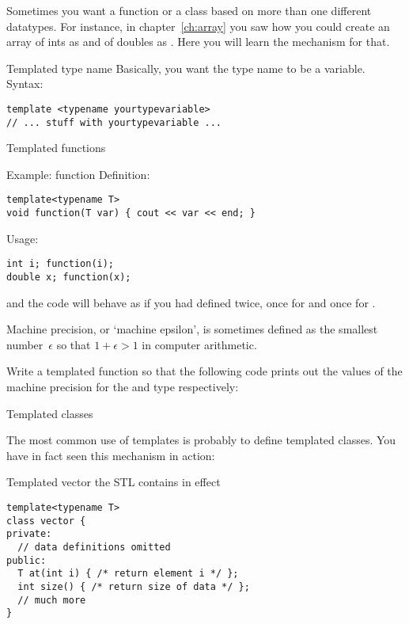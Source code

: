 
Sometimes you want a function or a class based on more than one
different datatypes. For instance, in chapter~\ref{ch:array} you saw
how you could create an array of ints as  and
of doubles as . Here you will learn the mechanism
for that.

\begin{block}{Templated type name}
  \label{sl:template-gen}
  Basically, you want the type name to be a variable. Syntax:
\begin{verbatim}
template <typename yourtypevariable>
// ... stuff with yourtypevariable ...
\end{verbatim}
\end{block}

 {Templated functions}

\begin{block}{Example: function}
  \label{sl:template-fun}
  Definition:
\begin{verbatim}
template<typename T>
void function(T var) { cout << var << end; }
\end{verbatim}
Usage:
\begin{verbatim}
int i; function(i);
double x; function(x);
\end{verbatim}
and the code will behave as if you had defined  twice,
once for  and once for .
\end{block}

\begin{exercise}
  \label{ex:eps-template}
  Machine precision, or `machine epsilon', is sometimes defined as the
  smallest number~$\epsilon$ so that $1+\epsilon>1$ in computer
  arithmetic.

  Write a templated function  so that the following code
  prints out the values of the machine precision for the  and
   type respectively:
\end{exercise}

 {Templated classes}

The most common use of templates is probably to define templated
classes.
You have in fact seen this mechanism in action:
\begin{block}{Templated vector}
  \label{sl:template-vector}
  the \ac{STL} contains
  in effect
\begin{verbatim}
template<typename T>
class vector {
private:
  // data definitions omitted
public:
  T at(int i) { /* return element i */ };
  int size() { /* return size of data */ };
  // much more
}
\end{verbatim}
\end{block}

